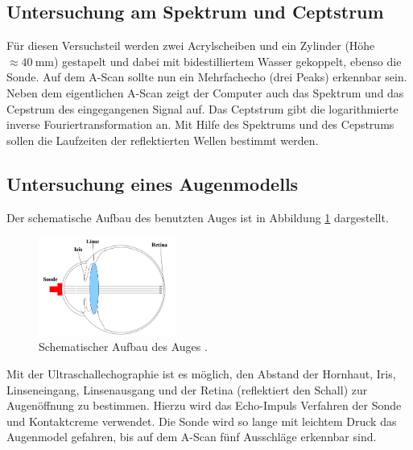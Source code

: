\subsection{Untersuchung am Spektrum und Ceptstrum}

Für diesen Versuchsteil werden zwei Acrylscheiben und ein Zylinder (Höhe $\approx \SI{40}{\milli\meter}$)
gestapelt und dabei mit bidestilliertem Wasser gekoppelt, ebenso die Sonde.
Auf dem A-Scan sollte nun ein Mehrfachecho (drei Peaks) erkennbar sein.
Neben dem eigentlichen A-Scan zeigt der Computer auch das Spektrum und das Cepstrum des
eingegangenen Signal auf.
Das Ceptstrum gibt die logarithmierte inverse Fouriertransformation an.
Mit Hilfe des Spektrums und des Cepstrums sollen die Laufzeiten der reflektierten Wellen
bestimmt werden.

\subsection{Untersuchung eines Augenmodells}

Der schematische Aufbau des benutzten Auges ist in Abbildung \ref{fig: auge} dargestellt.
\begin{figure}[h]
  \centering
  \includegraphics[width=0.4\textwidth]{pics/auge.png}
  \caption{Schematischer Aufbau des Auges \cite{anleitungus1}.}
  \label{fig: auge}
\end{figure}
Mit der Ultraschallechographie ist es möglich, den Abstand der Hornhaut, Iris, Linseneingang, Linsenausgang
und der Retina (reflektiert den Schall) zur Augenöffnung zu bestimmen.
Hierzu wird das Echo-Impuls Verfahren der Sonde und Kontaktcreme verwendet.
Die Sonde wird so lange mit leichtem Druck das Augenmodel gefahren, bis auf dem
A-Scan fünf Ausschläge erkennbar sind.
